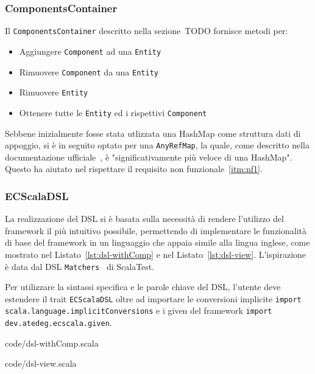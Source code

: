 \subsubsection{ComponentsContainer}\label{subsubsec:components-container}
Il \texttt{ComponentsContainer} descritto nella sezione~TODO fornisce metodi per:
\begin{itemize}
    \item Aggiungere \texttt{Component} ad una \texttt{Entity}
    \item Rimuovere \texttt{Component} da una \texttt{Entity}
    \item Rimuovere \texttt{Entity}
    \item Ottenere tutte le \texttt{Entity} ed i rispettivi \texttt{Component}
\end{itemize}
Sebbene inizialmente fosse stata utlizzata una HashMap come struttura dati di appoggio, si è in seguito optato
per una \texttt{AnyRefMap}, la quale, come descritto nella documentazione ufficiale~\cite{anyRefMap}, è "significativamente più veloce di una HashMap".
Questo ha aiutato nel rispettare il requisito non funzionale~\ref{itm:nf1}.

\subsubsection{ECScalaDSL}\label{subsubsec:dsl-impl}
La realizzazione del DSL si è basata sulla necessità di rendere l'utilizzo del framework il più intuitivo possibile,
permettendo di implementare le funzionalità di base del framework in un linguaggio che appaia simile alla lingua inglese, come mostrato nel
Listato~\ref{lst:dsl-withComp} e nel Listato~\ref{lst:dsl-view}.
L'ispirazione è data dal DSL \texttt{Matchers}~\cite{matchers} di ScalaTest.

Per utilizzare la sintassi specifica e le parole chiave del DSL, l'utente deve estendere il trait \texttt{ECScalaDSL} oltre ad importare
le conversioni implicite \texttt{import scala.language.implicitConversions} e i given del framework \texttt{import dev.atedeg.ecscala.given}.


{code/dsl-withComp.scala}


{code/dsl-view.scala}

